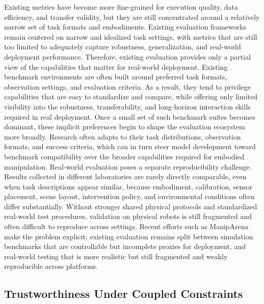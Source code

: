 \documentclass[acmsmall,screen,review]{acmart}
\begin{document}
Existing metrics have become more fine-grained for execution quality, data efficiency, and transfer validity, but they are still concentrated around a relatively narrow set of task formats and embodiments. 
Existing evaluation frameworks remain centered on narrow and idealized task settings, with metrics that are still too limited to adequately capture robustness, generalization, and real-world deployment performance.
Therefore, existing evaluation provides only a partial view of the capabilities that matter for real-world deployment.
Existing benchmark environments are often built around preferred task formats, observation settings, and evaluation criteria. 
As a result, they tend to privilege capabilities that are easy to standardize and compare, while offering only limited visibility into the robustness, transferability, and long-horizon interaction skills required in real deployment. 
Once a small set of such benchmark suites becomes dominant, these implicit preferences begin to shape the evaluation ecosystem more broadly. 
Research often adapts to their task distributions, observation formats, and success criteria, which can in turn steer model development toward benchmark compatibility over the broader capabilities required for embodied manipulation.
Real-world evaluation poses a separate reproducibility challenge. 
Results collected in different laboratories are rarely directly comparable, even when task descriptions appear similar, because embodiment, calibration, sensor placement, scene layout, intervention policy, and environmental conditions often differ substantially. 
Without stronger shared physical protocols and standardized real-world test procedures, validation on physical robots is still fragmented and often difficult to reproduce across settings.
Recent efforts such as ManipArena~\cite{sun2026maniparena} make the problem explicit: existing evaluation remains split between simulation benchmarks that are controllable but incomplete proxies for deployment, and real-world testing that is more realistic but still fragmented and weakly reproducible across platforms.

\subsection{Trustworthiness Under Coupled Constraints}\label{sec:challenge_safety}
\end{document}
